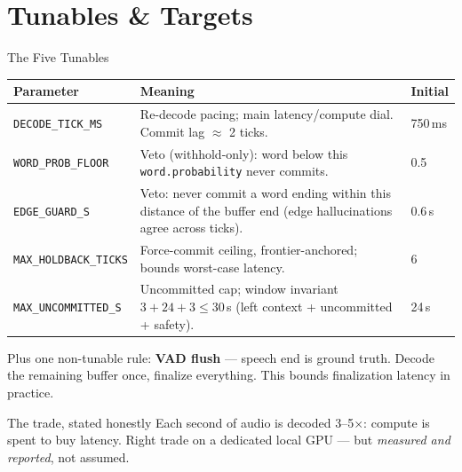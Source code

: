 \documentclass{beamer}
\begin{document}
\section{Tunables \& Targets}

\begin{frame}{The Five Tunables}
    \begin{table}
    \centering\scriptsize
    \begin{tabular}{@{} l p{5.4cm} l @{}}
        \toprule
        \textbf{Parameter} & \textbf{Meaning} & \textbf{Initial} \\
        \midrule
        \texttt{DECODE\_TICK\_MS} & Re-decode pacing; main latency/compute dial.
            Commit lag $\approx$ 2 ticks. & 750\,ms \\
        \texttt{WORD\_PROB\_FLOOR} & Veto (withhold-only): word below this
            \texttt{word.probability} never commits. & 0.5 \\
        \texttt{EDGE\_GUARD\_S} & Veto: never commit a word ending within this
            distance of the buffer end (edge hallucinations agree across
            ticks). & 0.6\,s \\
        \texttt{MAX\_HOLDBACK\_TICKS} & Force-commit ceiling, frontier-anchored;
            bounds worst-case latency. & 6 \\
        \texttt{MAX\_UNCOMMITTED\_S} & Uncommitted cap; window invariant
            $3 + 24 + 3 \leq 30$\,s (left context + uncommitted + safety). & 24\,s \\
        \bottomrule
    \end{tabular}
    \end{table}

    \vspace{-0.2em}
    \scriptsize
    Plus one non-tunable rule: \textbf{VAD flush} --- speech end is ground truth.
    Decode the remaining buffer once, finalize everything. This bounds
    finalization latency in practice.

    \begin{block}{\footnotesize The trade, stated honestly}
        \footnotesize
        Each second of audio is decoded 3--5$\times$: compute is spent to buy
        latency. Right trade on a dedicated local GPU --- but
        \emph{measured and reported}, not assumed.
    \end{block}
\end{frame}
\end{document}
